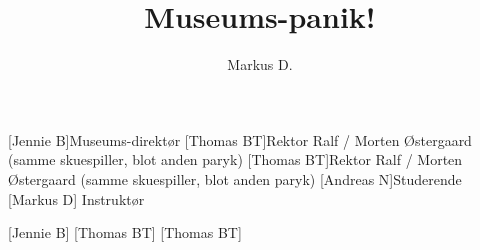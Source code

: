 \documentclass[a4paper,12pt]{article}
\title{Museums-panik!}
\author{Markus D.}
\begin{document}
\maketitle




\begin{roles}
	[Jennie B]Museums-direktør
	[Thomas BT]Rektor Ralf / Morten Østergaard (samme skuespiller, blot anden paryk)
		[Thomas BT]Rektor Ralf / Morten Østergaard (samme skuespiller, blot anden paryk)
	[Andreas N]Studerende
	[Markus D] Instruktør
\end{roles}


\begin{props}
	[Jennie B] 
	[Thomas BT] 
	[Thomas BT] 
\end{props}
\end{document}
